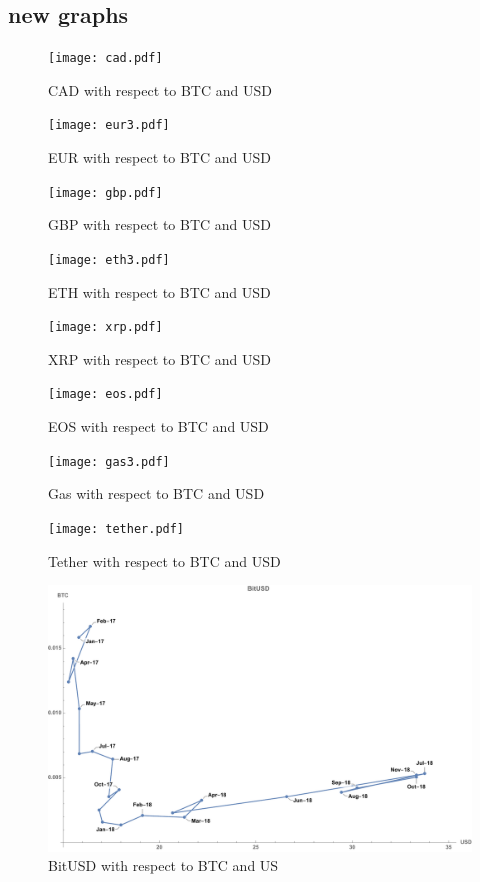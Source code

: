 \subsection{new graphs}



\begin{figure}[!htb]
	\texttt{[image: cad.pdf]}
	\caption{CAD with respect to BTC and USD}\label{fig:cad1}
	\endminipage\hfill
	\texttt{[image: eur3.pdf]}
	\caption{EUR with respect to BTC and USD}\label{fig:eur1}
	\endminipage\hfill
	\texttt{[image: gbp.pdf]}
	\caption{GBP with respect to BTC and USD}\label{fig:gbp1}
	\endminipage
\end{figure}

\begin{figure}[!htb]
	\texttt{[image: eth3.pdf]}
	\caption{ETH with respect to BTC and USD}\label{fig:cad1}
	\endminipage\hfill
	\texttt{[image: xrp.pdf]}
	\caption{XRP with respect to BTC and USD}\label{fig:eur1}
	\endminipage\hfill
	\texttt{[image: eos.pdf]}
	\caption{EOS with respect to BTC and USD}\label{fig:gbp1}
	\endminipage
\end{figure}

\begin{figure}[!htb]
	\texttt{[image: gas3.pdf]}
	\caption{Gas with respect to BTC and USD}\label{fig:cad1}
	\endminipage\hfill
	\texttt{[image: tether.pdf]}
	\caption{Tether with respect to BTC and USD}\label{fig:eur1}
	\endminipage\hfill
	\includegraphics[width=\linewidth]{figures/BitUSD_labled.pdf}
	\caption{BitUSD with respect to BTC and US}\label{fig:bitusd1}
	\endminipage\hfill
\end{figure}

